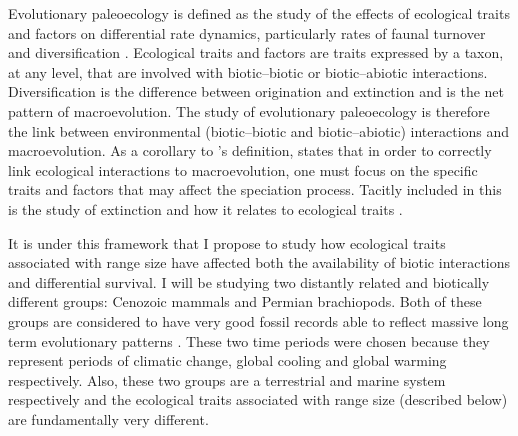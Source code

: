 \documentclass[12pt,letterpaper]{article}
\begin{document}
Evolutionary paleoecology is defined as the study of the effects of ecological traits and factors on differential rate dynamics, particularly rates of faunal turnover and diversification \citep{Kitchell1985a}. Ecological traits and factors are traits expressed by a taxon, at any level, that are involved with biotic--biotic or biotic--abiotic interactions. Diversification is the difference between origination and extinction and is the net pattern of macroevolution. The study of evolutionary paleoecology is therefore the link between environmental (biotic--biotic and biotic--abiotic) interactions and macroevolution. As a corollary to \citet{Kitchell1985a}'s definition, \citet{Allmon1994} states that in order to correctly link ecological interactions to macroevolution, one must focus on the specific traits and factors that may affect the speciation process. Tacitly included in this is the study of extinction and how it relates to ecological traits \citep{Kitchell1990}.


It is under this framework that I propose to study how ecological traits associated with range size have affected both the availability of biotic interactions and differential survival. I will be studying two distantly related and biotically different groups: Cenozoic mammals and Permian brachiopods. Both of these groups are considered to have very good fossil records able to reflect massive long term evolutionary patterns \citep{Mark1977}. These two time periods were chosen because they represent periods of climatic change, global cooling and global warming respectively. Also, these two groups are a terrestrial and marine system respectively and the ecological traits associated with range size (described below) are fundamentally very different. 


\end{document}
